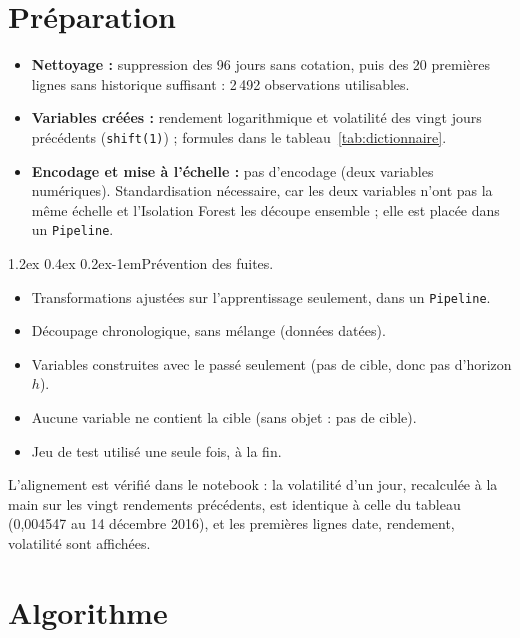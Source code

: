 \documentclass[11pt,a4paper]{article}
\makeatletter
\renewcommand\paragraph{\@startsection{paragraph}{4}{\z@}%
  {1.2ex \@plus 0.4ex \@minus 0.2ex}{-1em}{\normalfont\normalsize\bfseries}}
\makeatother
\begin{document}
\section{Préparation}
\label{sec:preparation}
\begin{itemize}
  \item \textbf{Nettoyage :} suppression des 96 jours sans cotation, puis des 20 premières lignes sans historique suffisant : 2\,492 observations utilisables.
  \item \textbf{Variables créées :} rendement logarithmique et volatilité des vingt jours précédents (\texttt{shift(1)}) ; formules dans le tableau~\ref{tab:dictionnaire}.
  \item \textbf{Encodage et mise à l'échelle :} pas d'encodage (deux variables numériques). Standardisation nécessaire, car les deux variables n'ont pas la même échelle et l'Isolation Forest les découpe ensemble ; elle est placée dans un \texttt{Pipeline}.
\end{itemize}

\paragraph{Prévention des fuites.}
\begin{itemize}
  \item[$\boxtimes$] Transformations ajustées sur l'apprentissage seulement, dans un \texttt{Pipeline}.
  \item[$\boxtimes$] Découpage chronologique, sans mélange (données datées).
  \item[$\boxtimes$] Variables construites avec le passé seulement  (pas de cible, donc pas d'horizon $h$).
  \item[$\boxtimes$] Aucune variable ne contient la cible (sans objet : pas de cible).
  \item[$\boxtimes$] Jeu de test utilisé une seule fois, à la fin.
\end{itemize}
L'alignement est vérifié dans le notebook : la volatilité d'un jour, recalculée à la main sur les vingt rendements précédents, est identique à celle du tableau (0,004547 au 14 décembre 2016), et les premières lignes date, rendement, volatilité sont affichées.

\section{Algorithme}
\label{sec:algorithme}
\end{document}
